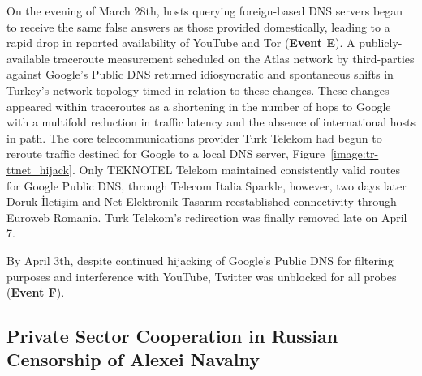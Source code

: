 On the evening of March 28th, hosts querying foreign-based DNS servers began to
receive the same false answers as those provided domestically, leading to a
rapid drop in reported availability of YouTube and Tor (\textbf{Event E}). A
publicly-available traceroute measurement scheduled on the Atlas network by
third-parties against Google's Public DNS returned idiosyncratic and
spontaneous shifts in Turkey's network topology timed in relation to these
changes. These changes appeared within traceroutes as a shortening in the
number of hops to Google with a multifold reduction in traffic latency and the
absence of international hosts in path. The core telecommunications provider
Turk Telekom had begun to reroute traffic destined for Google to a local DNS
server, Figure~\ref{image:tr-ttnet_hijack}. Only TEKNOTEL Telekom maintained
consistently valid routes for Google Public DNS, through Telecom Italia
Sparkle, however, two days later Doruk \.{I}leti\c{s}im and Net Elektronik
Tasar{\i}m reestablished connectivity through Euroweb Romania. Turk Telekom's
redirection was finally removed late on April 7.

By April 3th, despite continued hijacking of Google's Public DNS for filtering
purposes and interference with YouTube, Twitter was unblocked for all probes
(\textbf{Event F}).

\subsection{Private Sector Cooperation in Russian Censorship of Alexei Navalny}
\label{sec:russia}


